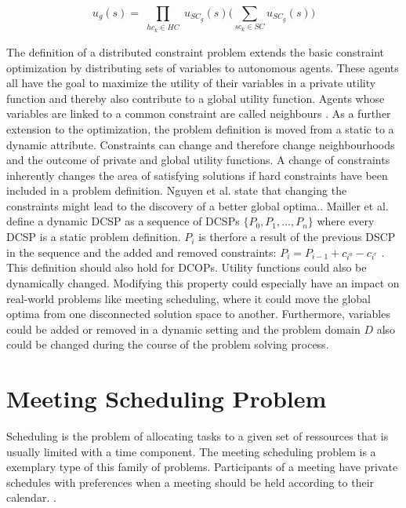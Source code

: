 \[ u_{g}(s) = \prod_{\substack{hc_{k} \in HC}} u_{SC_{g}}(s) \bigg( \sum_{sc_{k} \in SC} u_{SC_{g}}(s) \bigg)\]  %


The definition of a distributed constraint problem extends the basic constraint optimization by distributing sets of variables to autonomous agents. These agents all have the goal to maximize the utility of their variables in a private utility function and thereby also contribute to a global utility function. Agents whose variables are linked to a common constraint are called neighbours \cite{Chapman2011, Farinelli, Petcu2003}.
\newline\newline 
As a further extension to the optimization, the problem definition is moved from a static to a dynamic attribute. Constraints can change and  therefore change neighbourhoods and the outcome of private and global utility functions. A change of constraints inherently changes the area of satisfying solutions if hard constraints have been included in a problem definition. Nguyen et al. state that changing the constraints might lead to the discovery of a better global optima.\cite{Nguyen2012}. Mailler et al. define a dynamic DCSP as a sequence of DCSPs \(\{P_{0}, P_{1}, ..., P_{n}\}\) where every DCSP is a static problem definition. \(P_{i}\) is therfore a result of the previous DSCP in the sequence and the added and removed constraints: \(P_{i} = P_{i-1} + c_{i^{a}} - c_{i^{r}}\) \cite{Maillera}. This definition should also hold for DCOPs. Utility functions could also be dynamically changed. Modifying this property could especially have an impact on real-world problems like meeting scheduling, where it could move the global optima from one disconnected solution space to another\cite{Nguyen2012}. Furthermore, variables could be added or removed in a dynamic setting and the problem domain \(D\) also could be changed during the course of the problem solving process.

\section{Meeting Scheduling Problem}  

Scheduling is the problem of allocating tasks to a given set of ressources that is usually limited with a time component. The meeting scheduling problem is a exemplary type of this family of problems. Participants of a meeting have private schedules with preferences when a meeting should be held according to their calendar. \cite{Farinelli}. 
    
